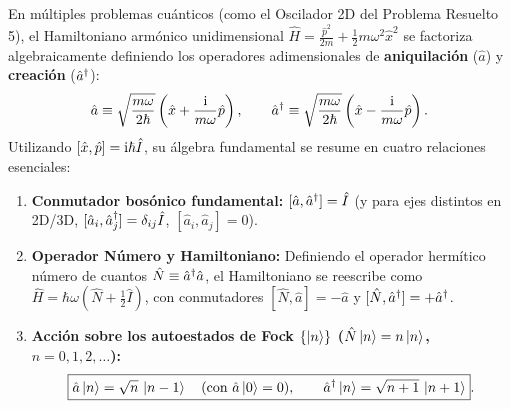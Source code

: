 En múltiples problemas cuánticos (como el Oscilador 2D del Problema Resuelto 5), el Hamiltoniano armónico unidimensional $\hat{H} = \frac{\hat{p}^2}{2m} + \frac{1}{2}m\omega^2\hat{x}^2$ se factoriza algebraicamente definiendo los operadores adimensionales de \textbf{aniquilación} ($\hat{a}$) y \textbf{creación} ($\hat{a}^\dagger$):
\begin{equation}
    \hat{a} \equiv \sqrt{\frac{m\omega}{2\hbar}}\left(\hat{x} + \frac{\mathrm{i}}{m\omega}\hat{p}\right), \qquad
    \hat{a}^\dagger \equiv \sqrt{\frac{m\omega}{2\hbar}}\left(\hat{x} - \frac{\mathrm{i}}{m\omega}\hat{p}\right).
\end{equation}
Utilizando $[\hat{x}, \hat{p}] = \mathrm{i}\hbar\hat{I}$, su álgebra fundamental se resume en cuatro relaciones esenciales:
\begin{enumerate}
    \item \textbf{Conmutador bosónico fundamental:} $[\hat{a}, \hat{a}^\dagger] = \hat{I}$ (y para ejes distintos en 2D/3D, $[\hat{a}_i, \hat{a}_j^\dagger] = \delta_{ij}\hat{I}$, $[\hat{a}_i, \hat{a}_j] = 0$).
    \item \textbf{Operador Número y Hamiltoniano:} Definiendo el operador hermítico número de cuantos $\hat{N} \equiv \hat{a}^\dagger\hat{a}$, el Hamiltoniano se reescribe como $\hat{H} = \hbar\omega\left(\hat{N} + \frac{1}{2}\hat{I}\right)$, con conmutadores $[\hat{N}, \hat{a}] = -\hat{a}$ y $[\hat{N}, \hat{a}^\dagger] = +\hat{a}^\dagger$.
    \item \textbf{Acción sobre los autoestados de Fock $\{\left| n \right\rangle\}$ ($\hat{N}\left| n \right\rangle = n\left| n \right\rangle$, $n=0,1,2,\dots$):}
    \begin{equation}
        \boxed{\hat{a}\left| n \right\rangle = \sqrt{n}\,\left| n-1 \right\rangle \quad (\text{con } \hat{a}\left| 0 \right\rangle = 0), \qquad \hat{a}^\dagger\left| n \right\rangle = \sqrt{n+1}\,\left| n+1 \right\rangle}.
    \end{equation}
\end{enumerate}

